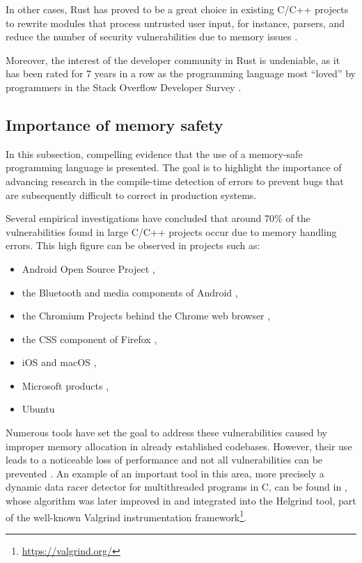 \documentclass[../Thesis.tex]{subfiles}
\begin{document}
In other cases, Rust has proved to be a great choice in existing C/C++ projects to rewrite modules
that process untrusted user input, for instance, parsers,
and reduce the number of security vulnerabilities due to memory issues \cite{chifflier2017writing}.

Moreover, the interest of the developer community in Rust is undeniable,
as it has been rated for 7 years in a row as the programming language most ``loved'' by programmers
in the Stack Overflow Developer Survey \cite{so-survey2022}.

\subsection{Importance of memory safety}

In this subsection, compelling evidence that
the use of a memory-safe programming language is presented.
The goal is to highlight the importance of advancing research in the compile-time detection of errors
to prevent bugs that are subsequently difficult to correct in production systems.

Several empirical investigations have concluded that around 70\% of the vulnerabilities
found in large C/C++ projects occur due to memory handling errors.
This high figure can be observed in projects such as:

\begin{itemize}
      \item Android Open Source Project \cite{memory-bugs-android},
      \item the Bluetooth and media components of Android \cite{memory-bugs-android-media-bluetooth},
      \item the Chromium Projects behind the Chrome web browser \cite{memory-bugs-chrome},
      \item the CSS component of Firefox \cite{memory-bugs-firefox},
      \item iOS and macOS \cite{memory-bugs-ios-macos},
      \item Microsoft products \cite{miller-security-microsoft2019, memory-bugs-microsoft},
      \item Ubuntu \cite{memory-bugs-ubuntu}
\end{itemize}

Numerous tools have set the goal to address these vulnerabilities
caused by improper memory allocation in already established codebases.
However, their use leads to a noticeable loss of performance and
not all vulnerabilities can be prevented \cite{szekeres2013sok}.
An example of an important tool in this area, more precisely
a dynamic data racer detector for multithreaded programs in C,
can be found in \cite{savage1997eraser},
whose algorithm was later improved in \cite{jannesari2009helgrind+} and
integrated into the Helgrind tool, part of the well-known
Valgrind instrumentation framework\footnote{\url{https://valgrind.org/}}.
\end{document}
